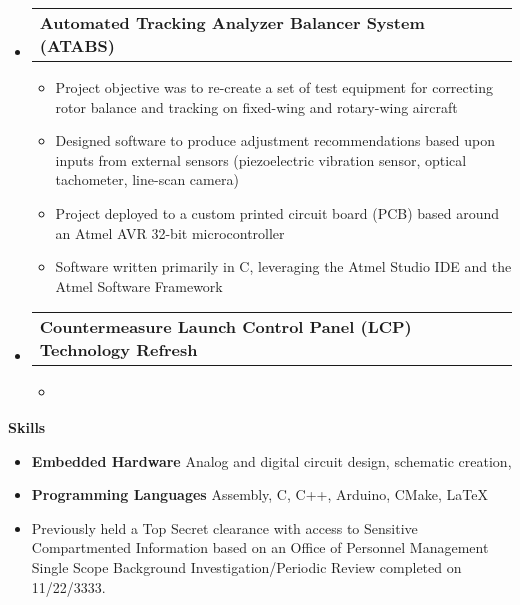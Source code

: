 \documentclass[letterpaper,12pt]{article}
\makeatletter
\def \entryspacing {-0pt}
\renewcommand{\section}[2]{\vspace{5pt}
  \colorbox{secondary}{\color{white}\raggedbottom\normalsize\textbf{{#1}{\hspace{7pt}#2}}}
}
\newcommand{\resumeEntryStart}{\begin{itemize}[leftmargin=2.5mm]}
\newcommand{\resumeEntryEnd}{\end{itemize}\vspace{\entryspacing}}
\newcommand{\resumeItemListStart}{\begin{itemize}[leftmargin=4.5mm]}
\newcommand{\resumeItemListEnd}{\end{itemize}}
\newcommand{\resumeItem}[1]{
  \item\small{
    {#1 \vspace{-2pt}}
  }
}
\newcommand{\resumeEntryTD}[2]{
  \vspace{-1pt}\item[]
    \begin{tabular*}{0.97\textwidth}{l@{\extracolsep{\fill}}r}
      \textbf{\color{primary}#1} & {\firabook\color{accent}\small#2} \\
    \end{tabular*}\vspace{-6pt}
}
\newcommand{\resumeEntryS}[2]{
  \item[]\small{
    \textbf{\color{primary}#1 }{ #2 \vspace{-6pt}}
  }
}
\makeatother
\begin{document}
  \resumeEntryStart
    \resumeEntryTD
      {Automated Tracking Analyzer Balancer System (ATABS)}{}
    \resumeItemListStart
      \resumeItem {Project objective was to re-create a set of test equipment for correcting rotor balance and tracking on fixed-wing and rotary-wing aircraft}
      \resumeItem {Designed software to produce adjustment recommendations based upon inputs from external sensors (piezoelectric vibration sensor, optical tachometer, line-scan camera)}
	  \resumeItem {Project deployed to a custom printed circuit board (PCB) based around an Atmel AVR 32-bit microcontroller}
	  \resumeItem {Software written primarily in C, leveraging the Atmel Studio IDE and the Atmel Software Framework} 
    \resumeItemListEnd
  \resumeEntryEnd

  \resumeEntryStart
    \resumeEntryTD
      {Countermeasure Launch Control Panel (LCP) Technology Refresh}{}
    \resumeItemListStart
      \resumeItem {}
    \resumeItemListEnd
  \resumeEntryEnd

\section{\faToolbox}{Skills}
 \resumeEntryStart
  \resumeEntryS{Embedded Hardware} {Analog and digital circuit design, schematic creation, }
  \resumeEntryS{Programming Languages} {Assembly, C, C++, Arduino, CMake, \LaTeX}
  \resumeEntryS{}{Previously held a Top Secret clearance with access to Sensitive Compartmented Information based on an Office of Personnel Management Single Scope Background Investigation/Periodic Review completed on 11/22/3333.}
 \resumeEntryEnd
\end{document}
